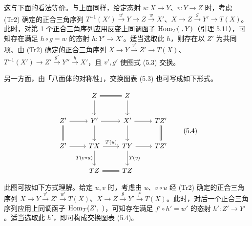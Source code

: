 
这与下面的看法等价。与上面同样，给定态射 $u\colon X\to Y$、$v\colon Y\to Z$ 时，考虑 (Tr2) 确定的正合三角序列 $T^{-1}(X')\xrightarrow{u'}Y\to Z\xrightarrow{w}X'$、$X\to Z\xrightarrow{g}Y'\to T(X)$。此时，对第 1 个正合三角序列应用反变上同调函子 $\operatorname{Hom}_{\mathcal{T}}(\ ,Y)$（引理 5.11），可知存在满足 $h\circ g=w$ 的态射 $h\colon Y'\to X'$。适当选取此 $h$，则存在以 $Z'$ 为共同项、由 (Tr2) 确定的正合三角序列 $X\to Y\xrightarrow{v'}Z'\to T(X)$、$T^{-1}(X')\to Z'\xrightarrow{g'}Y''\xrightarrow{h}X'$，且 $v',g'$ 使图式 (5.3) 交换。

另一方面，由「八面体的对称性」，交换图表 (5.3) 也可写成如下形式。

\begin{equation}
\begin{tikzcd}[row sep=2.2em, column sep=2.4em]
{} & Z \arrow[r,equal] \arrow[d] & Z \arrow[d] & {} \\
Z' \arrow[r] \arrow[d,equal] & Y' \arrow[r] \arrow[d] & X' \arrow[r] \arrow[d] & TZ' \arrow[d,equal] \\
Z' \arrow[r] & TX \arrow[r,"T(u)"] \arrow[d,"T(v\circ u)"'] & TY \arrow[r] \arrow[d,"T(v)"] & TZ' \\
{} & TZ \arrow[r,equal] & TZ & {}
\end{tikzcd} \tag{5.4}
\end{equation}


此图可按如下方式理解。给定 $u,v$ 时，考虑由 $u$、$v\circ u$ 经 (Tr2) 确定的正合三角序列 $X\to Y\xrightarrow{v'}Z'\xrightarrow{w'}T(X)$、$X\to Z\xrightarrow{g}Y'\xrightarrow{f'}T(X)$。此时，对后一个正合三角序列应用上同调函子 $\operatorname{Hom}_{\mathcal{T}}(Z',\ )$，可知存在满足 $f'\circ h'=w'$ 的态射 $h'\colon Z'\to Y'$。适当选取此 $h'$，即可构成交换图表 (5.4)。

